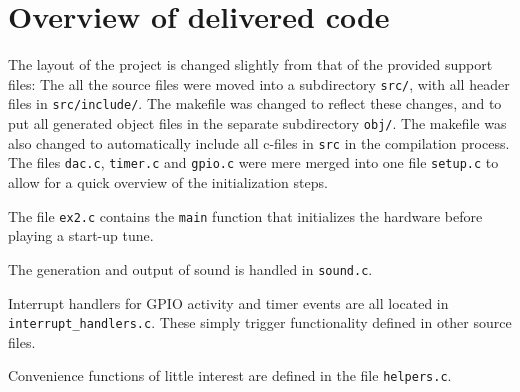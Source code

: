 \section{Overview of delivered code}
The layout of the project is changed slightly from that of the provided support files:
The all the source files were moved into a subdirectory \texttt{src/}, with all header files in \texttt{src/include/}.
The makefile was changed to reflect these changes, and to put all generated object files in the separate subdirectory \texttt{obj/}.
The makefile was also changed to automatically include all c-files in \texttt{src} in the compilation process.
The files \texttt{dac.c}, \texttt{timer.c} and \texttt{gpio.c} were mere merged into one file \texttt{setup.c} to allow for a quick overview of the initialization steps.

The file \texttt{ex2.c} contains the \texttt{main} function that initializes the hardware before playing a start-up tune.

The generation and output of sound is handled in \texttt{sound.c}.

Interrupt handlers for GPIO activity and timer events are all located in \texttt{interrupt\_handlers.c}.
These simply trigger functionality defined in other source files.

Convenience functions of little interest are defined in the file \texttt{helpers.c}.
